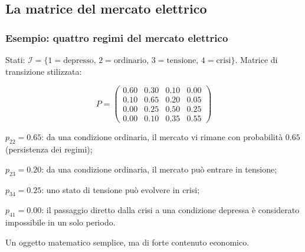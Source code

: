 

\subsection{La matrice del mercato elettrico}%

\begin{frame}%
%

\frametitle{Esempio: quattro regimi del mercato elettrico}%
%

%


Stati: $\mathcal{I} = \{ 1=\text{depresso}, \, 2=\text{ordinario}, \,
3=\text{tensione}, \, 4=\text{crisi} \}$. Matrice di transizione stilizzata:%

\[
P=
\begin{pmatrix}
0.60 & 0.30 & 0.10 & 0.00\\
0.10 & 0.65 & 0.20 & 0.05\\
0.00 & 0.25 & 0.50 & 0.25\\
0.00 & 0.10 & 0.35 & 0.55
\end{pmatrix}
\]


\medskip

\begin{stepitemize}
\item $p_{22}=0.65$: da una condizione ordinaria, il mercato vi rimane con
probabilit\`{a} $0.65$ (persistenza dei regimi);

\item $p_{23}=0.20$: da una condizione ordinaria, il mercato pu\`{o} entrare
in tensione;

\item $p_{34}=0.25$: uno stato di tensione pu\`{o} evolvere in crisi;

\item $p_{41}=0.00$: il passaggio diretto dalla crisi a una condizione
depressa \`{e} considerato impossibile in un solo periodo.
\end{stepitemize}

\medskip

\begin{center}
{\small Un oggetto matematico semplice, ma di forte contenuto economico.}
\end{center}

%

\transboxout
\end{frame}%


